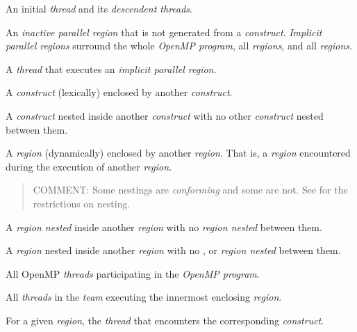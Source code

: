 \glossarydefstart
An initial \emph{thread} and its \emph{descendent threads}.
\glossarydefend

\glossarydefstart
An \emph{inactive parallel region} that is not generated from a
 \emph{construct}. \emph{Implicit parallel regions} surround the whole
\emph{OpenMP program}, all  \emph{regions}, and all 
\emph{regions}.

\glossarydefend

\glossarydefstart
A \emph{thread} that executes an \emph{implicit parallel region}.
\glossarydefend

\glossarydefstart
A \emph{construct} (lexically) enclosed by another \emph{construct}.
\glossarydefend

\glossarydefstart
A \emph{construct} nested inside another \emph{construct} with no other \emph{construct} nested 
between them.
\glossarydefend

\glossarydefstart
A \emph{region} (dynamically) enclosed by another \emph{region}. That is, a \emph{region} encountered 
during the execution of another \emph{region}.

\begin{quote}
COMMENT: Some nestings are \emph{conforming} and some are not. 
See  for the restrictions on nesting.
\end{quote}
\glossarydefend

\glossarydefstart
A \emph{region nested} inside another \emph{region} with no  \emph{region nested} between 
them. 
\glossarydefend

\glossarydefstart
A \emph{region} nested inside another \emph{region} with no ,  or  \emph{region nested} between them. 
\glossarydefend

\glossarydefstart
All OpenMP \emph{threads} participating in the \emph{OpenMP program}.
\glossarydefend

\glossarydefstart
All \emph{threads} in the \emph{team} executing the innermost enclosing  \emph{region}.
\glossarydefend

\glossarydefstart
For a given \emph{region}, the \emph{thread} that encounters the 
corresponding \emph{construct}.
\glossarydefend

